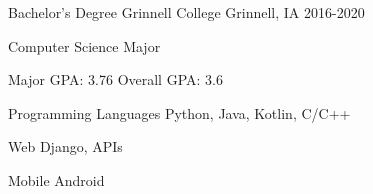 \documentclass[12pt, a4paper]{awesome-cv}
\begin{document}
\begin{cventries}

\end{cventries}


\begin{cventries}
  \cventry
    {Bachelor's Degree}
    {Grinnell College}
    {Grinnell, IA}
    {2016-2020}
    {
      \begin{cvitems}
        \item {Computer Science Major}
        \item {Major GPA: 3.76 \quad Overall GPA: 3.6}
      \end{cvitems}
    }
\end{cventries}


\begin{cvskills}
  \cvskill
    {Programming Languages} 
    {Python, Java, Kotlin, C/C++} 

  \cvskill
    {Web}
    {Django, APIs}

  \cvskill
    {Mobile}
    {Android}

\end{cvskills}


%
%
\end{document}
